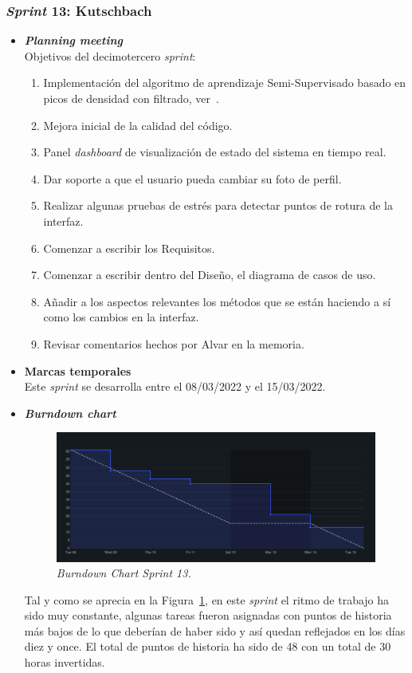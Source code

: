 \subsubsection{\textit{Sprint} 13: Kutschbach}
\begin{itemize}
\item \textbf{\textit{Planning meeting}}\\
Objetivos del decimotercero \textit{sprint}:
\begin{enumerate}
\item Implementación del algoritmo de aprendizaje Semi-Supervisado basado en picos de densidad con filtrado, ver~\cite{LI2019104895}.
\item Mejora inicial de la calidad del código.
\item Panel \textit{dashboard} de visualización de estado del sistema en tiempo real.
\item Dar soporte a que el usuario pueda cambiar su foto de perfil.
\item Realizar algunas pruebas de estrés para detectar puntos de rotura de la interfaz.
\item Comenzar a escribir los Requisitos.
\item Comenzar a escribir dentro del Diseño, el diagrama de casos de uso.
\item Añadir a los aspectos relevantes los métodos que se están haciendo a sí como los cambios en la interfaz.
\item Revisar comentarios hechos por Alvar en la memoria.
\end{enumerate}

\item \textbf{Marcas temporales}\\
Este \textit{sprint} se desarrolla entre el 08/03/2022 y el 15/03/2022.

\item \textbf{\textit{Burndown chart}}\\
\begin{figure}
\begin{center}
\includegraphics[width=\textwidth]{../img/anexos/sprints/BD-Sprint13}
\caption{\textit{Burndown Chart Sprint 13.}}\label{fig:BD-Sprint13}
\end{center}
\end{figure}
Tal y como se aprecia en la Figura~\ref{fig:BD-Sprint13}, en este \textit{sprint} el ritmo de trabajo ha sido muy constante, algunas tareas fueron asignadas con puntos de historia más bajos de lo que deberían de haber sido y así quedan reflejados en los días diez y once. El total de puntos de historia ha sido de 48 con un total de 30 horas invertidas.


\end{itemize}
